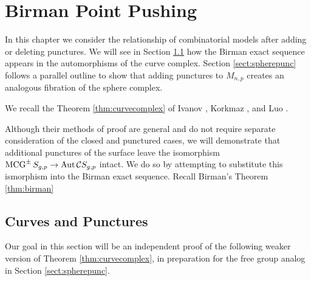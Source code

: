 \chapter{Birman Point Pushing}
\label{chap:birman}

In this chapter we consider the
relationship of combinatorial models
after adding or deleting punctures.
We will see in Section \ref{sect:curvepunc}
how the Birman exact sequence
appears in the automorphisms of the curve complex.
Section \ref{sect:spherepunc}
follows a parallel outline to show that adding
punctures to $M_{n,p}$ creates an analogous fibration
of the sphere complex.


We recall the Theorem \ref{thm:curvecomplex}
of
Ivanov \cite{MR1460387},
Korkmaz \cite{MR1696431},
and
Luo \cite{MR1722024}.

\curvecomplex*

Although their methods of proof are general and
do not require separate consideration of the closed and
punctured cases, we will demonstrate
that additional punctures of the surface
leave the isomorphism
$
\operatorname{MCG}^\pm S_{g,p} \to  \operatorname{Aut} \mathcal C S_{g,p}
$
intact.
We do so by attempting to substitute this ismorphism into the Birman exact sequence.
Recall Birman's Theorem \ref{thm:birman}

\birman*



\section{Curves and Punctures}
\label{sect:curvepunc}
Our goal in this section will be an independent proof of
the following
weaker version of Theorem \ref{thm:curvecomplex},
in preparation for the free group analog in Section \ref{sect:spherepunc}.
%



